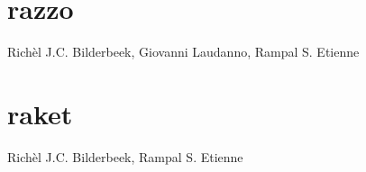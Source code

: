 \documentclass[]{dissertation}
\begin{document}
\chapter{razzo}
\label{chapter_razzo}
Rich\`el J.C. Bilderbeek, Giovanni Laudanno, Rampal S. Etienne
\newpage

%

\chapter{raket}
\label{chapter_raket}
Rich\`el J.C. Bilderbeek, Rampal S. Etienne
\newpage




%

% 

\appendix

%

\thumbfalse



% 
\end{document}
